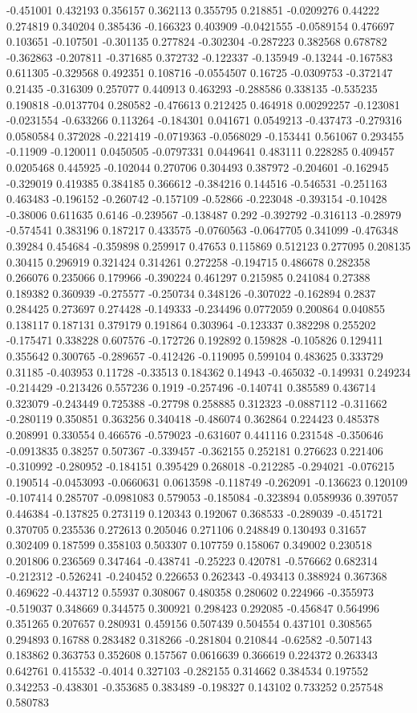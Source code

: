 -0.451001 0.432193 0.356157 0.362113 0.355795 0.218851 -0.0209276 0.44222 0.274819 0.340204 0.385436 -0.166323 0.403909 -0.0421555 -0.0589154 0.476697 0.103651 -0.107501 -0.301135 0.277824 -0.302304 -0.287223 0.382568 0.678782 -0.362863 -0.207811 -0.371685 0.372732 -0.122337 -0.135949 -0.13244 -0.167583 0.611305 -0.329568 0.492351 0.108716 -0.0554507 0.16725 -0.0309753 -0.372147 0.21435 -0.316309 0.257077 0.440913 0.463293 -0.288586 0.338135 -0.535235 0.190818 -0.0137704 0.280582 -0.476613 0.212425 0.464918 0.00292257 -0.123081 -0.0231554 -0.633266 0.113264 -0.184301 0.041671 0.0549213 -0.437473 -0.279316 0.0580584 0.372028 -0.221419 -0.0719363 -0.0568029 -0.153441 0.561067 0.293455 -0.11909 -0.120011 0.0450505 -0.0797331 0.0449641 0.483111 0.228285 0.409457 0.0205468 0.445925 -0.102044 0.270706 0.304493 0.387972 -0.204601 -0.162945 -0.329019 0.419385 0.384185 0.366612 -0.384216 0.144516 -0.546531 -0.251163 0.463483 -0.196152 -0.260742 -0.157109 -0.52866 -0.223048 -0.393154 -0.10428 -0.38006 0.611635 0.6146 -0.239567 -0.138487 0.292 -0.392792 -0.316113 -0.28979 -0.574541 0.383196 0.187217 0.433575 -0.0760563 -0.0647705 0.341099 -0.476348 0.39284 0.454684 -0.359898 0.259917 0.47653 0.115869 0.512123 0.277095 0.208135 0.30415 0.296919 0.321424 0.314261 0.272258 -0.194715 0.486678 0.282358 0.266076 0.235066 0.179966 -0.390224 0.461297 0.215985 0.241084 0.27388 0.189382 0.360939 -0.275577 -0.250734 0.348126 -0.307022 -0.162894 0.2837 0.284425 0.273697 0.274428 -0.149333 -0.234496 0.0772059 0.200864 0.040855 0.138117 0.187131 0.379179 0.191864 0.303964 -0.123337 0.382298 0.255202 -0.175471 0.338228 0.607576 -0.172726 0.192892 0.159828 -0.105826 0.129411 0.355642 0.300765 -0.289657 -0.412426 -0.119095 0.599104 0.483625 0.333729 0.31185 -0.403953 0.11728 -0.33513 0.184362 0.14943 -0.465032 -0.149931 0.249234 -0.214429 -0.213426 0.557236 0.1919 -0.257496 -0.140741 0.385589 0.436714 0.323079 -0.243449 0.725388 -0.27798 0.258885 0.312323 -0.0887112 -0.311662 -0.280119 0.350851 0.363256 0.340418 -0.486074 0.362864 0.224423 0.485378 0.208991 0.330554 0.466576 -0.579023 -0.631607 0.441116 0.231548 -0.350646 -0.0913835 0.38257 0.507367 -0.339457 -0.362155 0.252181 0.276623 0.221406 -0.310992 -0.280952 -0.184151 0.395429 0.268018 -0.212285 -0.294021 -0.076215 0.190514 -0.0453093 -0.0660631 0.0613598 -0.118749 -0.262091 -0.136623 0.120109 -0.107414 0.285707 -0.0981083 0.579053 -0.185084 -0.323894 0.0589936 0.397057 0.446384 -0.137825 0.273119 0.120343 0.192067 0.368533 -0.289039 -0.451721 0.370705 0.235536 0.272613 0.205046 0.271106 0.248849 0.130493 0.31657 0.302409 0.187599 0.358103 0.503307 0.107759 0.158067 0.349002 0.230518 0.201806 0.236569 0.347464 -0.438741 -0.25223 0.420781 -0.576662 0.682314 -0.212312 -0.526241 -0.240452 0.226653 0.262343 -0.493413 0.388924 0.367368 0.469622 -0.443712 0.55937 0.308067 0.480358 0.280602 0.224966 -0.355973 -0.519037 0.348669 0.344575 0.300921 0.298423 0.292085 -0.456847 0.564996 0.351265 0.207657 0.280931 0.459156 0.507439 0.504554 0.437101 0.308565 0.294893 0.16788 0.283482 0.318266 -0.281804 0.210844 -0.62582 -0.507143 0.183862 0.363753 0.352608 0.157567 0.0616639 0.366619 0.224372 0.263343 0.642761 0.415532 -0.4014 0.327103 -0.282155 0.314662 0.384534 0.197552 0.342253 -0.438301 -0.353685 0.383489 -0.198327 0.143102 0.733252 0.257548 0.580783 